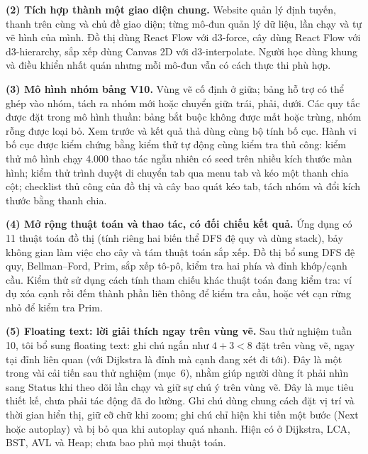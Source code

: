 \documentclass[11pt,a4paper]{article}
\begin{document}
\textbf{(2) Tích hợp thành một giao diện chung.}
Website quản lý định tuyến, thanh trên cùng và chủ đề giao diện; từng mô-đun quản lý dữ liệu, lần chạy và tự vẽ hình của mình. Đồ thị dùng React Flow với d3-force, cây dùng React Flow với d3-hierarchy, sắp xếp dùng Canvas 2D với d3-interpolate. Người học dùng khung và điều khiển nhất quán nhưng mỗi mô-đun vẫn có cách thực thi phù hợp.

\textbf{(3) Mô hình nhóm bảng V10.}
Vùng vẽ cố định ở giữa; bảng hỗ trợ có thể ghép vào nhóm, tách ra nhóm mới hoặc chuyển giữa trái, phải, dưới. Các quy tắc được đặt trong mô hình thuần: bảng bắt buộc không được mất hoặc trùng, nhóm rỗng được loại bỏ. Xem trước và kết quả thả dùng cùng bộ tính bố cục. Hành vi bố cục được kiểm chứng bằng kiểm thử tự động cùng kiểm tra thủ công: kiểm thử mô hình chạy 4.000 thao tác ngẫu nhiên có seed trên nhiều kích thước màn hình; kiểm thử trình duyệt di chuyển tab qua menu tab và kéo một thanh chia cột; checklist thủ công của đồ thị và cây bao quát kéo tab, tách nhóm và đổi kích thước bằng thanh chia.

\textbf{(4) Mở rộng thuật toán và thao tác, có đối chiếu kết quả.}
Ứng dụng có 11 thuật toán đồ thị (tính riêng hai biến thể DFS đệ quy và dùng stack), bảy không gian làm việc cho cây và tám thuật toán sắp xếp. Đồ thị bổ sung DFS đệ quy, Bellman--Ford, Prim, sắp xếp tô-pô, kiểm tra hai phía và đỉnh khớp/cạnh cầu. Kiểm thử sử dụng cách tính tham chiếu khác thuật toán đang kiểm tra: ví dụ xóa cạnh rồi đếm thành phần liên thông để kiểm tra cầu, hoặc vét cạn rừng nhỏ để kiểm tra Prim.

\textbf{(5) Floating text: lời giải thích ngay trên vùng vẽ.}
Sau thử nghiệm tuần 10, tôi bổ sung floating text: ghi chú ngắn như $4+3<8$ đặt trên vùng vẽ, ngay tại đỉnh liên quan (với Dijkstra là đỉnh mà cạnh đang xét đi tới). Đây là một trong vài cải tiến sau thử nghiệm (mục~6), nhằm giúp người dùng ít phải nhìn sang Status khi theo dõi lần chạy và giữ sự chú ý trên vùng vẽ. Đây là mục tiêu thiết kế, chưa phải tác động đã đo lường. Ghi chú dùng chung cách đặt vị trí và thời gian hiển thị, giữ cỡ chữ khi zoom; ghi chú chỉ hiện khi tiến một bước (Next hoặc autoplay) và bị bỏ qua khi autoplay quá nhanh. Hiện có ở Dijkstra, LCA, BST, AVL và Heap; chưa bao phủ mọi thuật toán.
\end{document}
